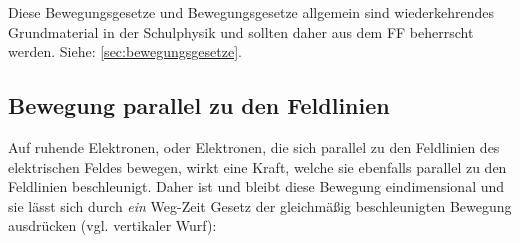 




%
%	






\begin{Wichtig}
Diese Bewegungsgesetze und Bewegungsgesetze allgemein sind wiederkehrendes Grundmaterial in der Schulphysik und sollten daher \glqq aus dem FF\grqq{} beherrscht werden. Siehe: \ref{sec:bewegungsgesetze}.
\end{Wichtig}

\subsection{Bewegung parallel zu den Feldlinien} \label{subsec:BewegungsgesetzParallel}

Auf ruhende Elektronen, oder Elektronen, die sich parallel zu den Feldlinien des elektrischen Feldes bewegen, wirkt eine Kraft, welche sie ebenfalls parallel zu den Feldlinien beschleunigt. Daher ist und bleibt diese Bewegung eindimensional und sie lässt sich durch \emph{ein} Weg-Zeit Gesetz der gleichmäßig beschleunigten Bewegung ausdrücken (vgl. vertikaler Wurf):

